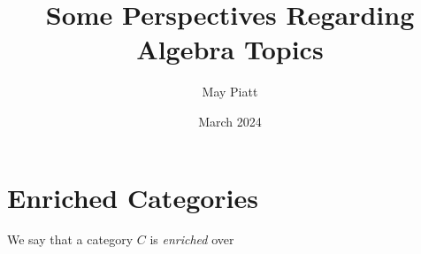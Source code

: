\documentclass{article}
\title{Some Perspectives Regarding Algebra Topics}
\author{May Piatt}
\date{March 2024}
\begin{document}
\maketitle
\tableofcontents
\section{Enriched Categories}
We say that a category $C$ is \textit{enriched} over 
\end{document}
